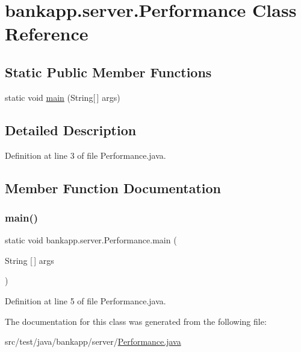 \hypertarget{classbankapp_1_1server_1_1_performance}{}\section{bankapp.\+server.\+Performance Class Reference}
\label{classbankapp_1_1server_1_1_performance}
\subsection*{Static Public Member Functions}
\begin{DoxyCompactItemize}
\item 
static void \hyperlink{classbankapp_1_1server_1_1_performance_a38f0ff93a84e96a398201565bd8c546b}{main} (String\mbox{[}$\,$\mbox{]} args)
\end{DoxyCompactItemize}


\subsection{Detailed Description}


Definition at line 3 of file Performance.\+java.



\subsection{Member Function Documentation}
\mbox{\label{classbankapp_1_1server_1_1_performance_a38f0ff93a84e96a398201565bd8c546b}} 
\subsubsection{\texorpdfstring{main()}{main()}}
{\footnotesize\ttfamily static void bankapp.\+server.\+Performance.\+main (\begin{DoxyParamCaption}\item[{String \mbox{[}$\,$\mbox{]}}]{args }\end{DoxyParamCaption})\hspace{0.3cm}{\ttfamily [static]}}



Definition at line 5 of file Performance.\+java.



The documentation for this class was generated from the following file\+:\begin{DoxyCompactItemize}
\item 
src/test/java/bankapp/server/\hyperlink{_performance_8java}{Performance.\+java}\end{DoxyCompactItemize}
